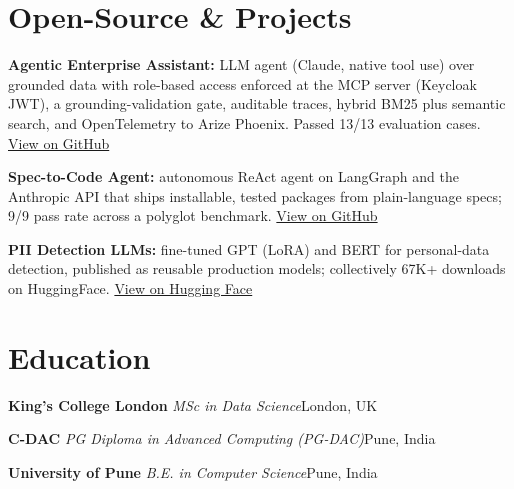 \documentclass[10pt,a4paper]{article}
\newcommand{\sep}{\,\textcolor{accent!60}{\textbar}\,}
\begin{document}
\section{Open-Source \& Projects}
\begin{tight}
  \item \textbf{Agentic Enterprise Assistant:} LLM agent (Claude, native tool use) over grounded data with role-based access enforced at the MCP server (Keycloak JWT), a grounding-validation gate, auditable traces, hybrid BM25 plus semantic search, and OpenTelemetry to Arize Phoenix. Passed 13/13 evaluation cases. \href{https://github.com/abhijeetscode/Agentic-Enterprise-Assistant}{View on GitHub}
  \item \textbf{Spec-to-Code Agent:} autonomous ReAct agent on LangGraph and the Anthropic API that ships installable, tested packages from plain-language specs; 9/9 pass rate across a polyglot benchmark. \href{https://github.com/abhijeetscode/Spec-to-Code-Agent}{View on GitHub}
  \item \textbf{PII Detection LLMs:} fine-tuned GPT (LoRA) and BERT for personal-data detection, published as reusable production models; collectively 67K+ downloads on HuggingFace. \href{https://huggingface.co/ab-ai/pii_model}{View on Hugging Face}
\end{tight}

\section{Education}
{\color{company}\bfseries King's College London}\sep{\itshape MSc in Data Science}\hfill {\color{muted}London, UK}\par\vspace{1pt}
{\color{company}\bfseries C-DAC}\sep{\itshape PG Diploma in Advanced Computing (PG-DAC)}\hfill {\color{muted}Pune, India}\par\vspace{1pt}
{\color{company}\bfseries University of Pune}\sep{\itshape B.E. in Computer Science}\hfill {\color{muted}Pune, India}\par
\end{document}
